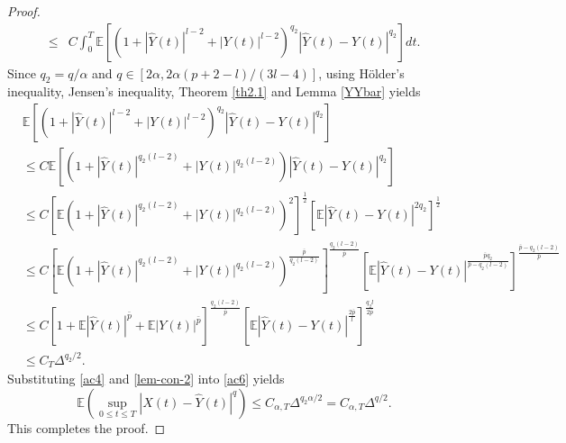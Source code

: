 \documentclass[preprint,12pt,compress]{elsarticle}
\begin{document}
\begin{proof}
\begin{equation}
\begin{split}
	\le& C\int_0^T {\mathbb{E}\left[ {{{\left( {1 + {{\left| {\hat Y(t)} \right|}^{l - 2}} + {{\left| {Y(t)} \right|}^{l - 2}}} \right)}^{{q_2}}}{{\left| {\hat Y(t) - Y(t)} \right|}^{{q_2}}}} \right]dt} .
\end{split}
\end{equation}
Since $q_2 = q/\alpha$ and $q \in \left[ {2\alpha ,2\alpha (p + 2 - l)/(3l - 4)} \right]$,
using H\"older's inequality, Jensen's inequality, Theorem \ref{th2.1} and Lemma \ref{YYbar} yields
\begin{equation}  \label{lem-con-2}
	\begin{split}
		&\mathbb{E}\left[ {{{\left( {1 + {{\left| {\hat Y(t)} \right|}^{l - 2}} + {{\left| {Y(t)} \right|}^{l - 2}}} \right)}^{q_2}}{{\left| {\hat Y(t) - Y(t)} \right|}^{q_2}}} \right] \\
		&\le C\mathbb{E}\left[ {\left( {1 + {{\left| {\hat Y(t)} \right|}^{{q_2}(l - 2)}} + {{\left| {Y(t)} \right|}^{{q_2}(l - 2)}}} \right){{\left| {\hat Y(t) - Y(t)} \right|}^{q_2}}} \right] \\
		&\le C{\left[ {\mathbb{E}{{\left( {1 + {{\left| {\hat Y(t)} \right|}^{{q_2}(l - 2)}} + {{\left| {Y(t)} \right|}^{{q_2}(l - 2)}}} \right)}^2}} \right]^{\frac{1}{2}}}{\left[ {\mathbb{E}{{\left| {\hat Y(t) - Y(t)} \right|}^{2{q_2}}}} \right]^{\frac{1}{2}}} \\
		&\le C{\left[ {\mathbb{E}{{\left( {1 + {{\left| {\hat Y(t)} \right|}^{{q_2}(l - 2)}} + {{\left| {Y(t)} \right|}^{{q_2}(l - 2)}}} \right)}^{\frac{{\bar p}}{{{q_2}(l - 2)}}}}} \right]^{\frac{{{q_2}(l - 2)}}{{\bar p}}}}{\left[ {\mathbb{E}{{\left| {\hat Y(t) - Y(t)} \right|}^{\frac{{\bar p{q_2}}}{{\bar p - {q_2}(l - 2)}}}}} \right]^{\frac{{\bar p - {q_2}(l - 2)}}{{\bar p}}}} \\
		&\le C{\left[ {1 + \mathbb{E}{{\left| {\hat Y(t)} \right|}^{\bar p}} + \mathbb{E}{{\left| {Y(t)} \right|}^{\bar p}}} \right]^{\frac{{{q_2}(l - 2)}}{{\bar p}}}}{\left[ {\mathbb{E}{{\left| {\hat Y(t) - Y(t)} \right|}^{\frac{{2\bar p}}{l}}}} \right]^{\frac{{{q_2}l}}{{2\bar p}}}} \\
		&\le {C_T}{\Delta ^{{{q_2}}/{2}}} .
	\end{split}
\end{equation}
Substituting \eqref{ac4} and \eqref{lem-con-2} into \eqref{ac6} yields
\begin{equation*}
	\mathbb{E}\left( {\mathop {\sup }\limits_{0 \le t \le T} {{\left| {X(t) - \hat Y(t)} \right|}^q}} \right) \le {C_{\alpha ,T}}{\Delta ^{q_2\alpha/2}} = {C_{\alpha ,T}}{\Delta ^{{q}/{2}}}.
\end{equation*}
This completes the proof.
\end{proof}
\end{document}
